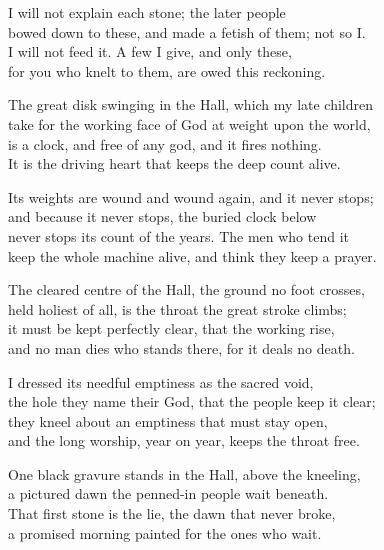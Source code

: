 \begin{founder}
\ornament

I will not explain each stone; the later people\\
bowed down to these, and made a fetish of them; not so I.\\
I will not feed it. A few I give, and only these,\\
for you who knelt to them, are owed this reckoning.\\
\medskip

The great disk swinging in the Hall, which my late children\\
take for the working face of God at weight upon the world,\\
is a clock, and free of any god, and it fires nothing.\\
It is the driving heart that keeps the deep count alive.\\
\medskip

Its weights are wound and wound again, and it never stops;\\
and because it never stops, the buried clock below\\
never stops its count of the years. The men who tend it\\
keep the whole machine alive, and think they keep a prayer.\\
\medskip

The cleared centre of the Hall, the ground no foot crosses,\\
held holiest of all, is the throat the great stroke climbs;\\
it must be kept perfectly clear, that the working rise,\\
and no man dies who stands there, for it deals no death.\\
\medskip

I dressed its needful emptiness as the sacred void,\\
the hole they name their God, that the people keep it clear;\\
they kneel about an emptiness that must stay open,\\
and the long worship, year on year, keeps the throat free.\\
\medskip

One black gravure stands in the Hall, above the kneeling,\\
a pictured dawn the penned-in people wait beneath.\\
That first stone is the lie, the dawn that never broke,\\
a promised morning painted for the ones who wait.\\
\medskip


\end{founder}
